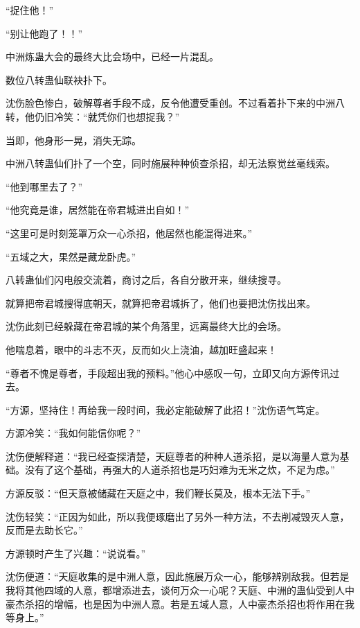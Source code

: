 
\begin{this_body}

“捉住他！”

“别让他跑了！！”

中洲炼蛊大会的最终大比会场中，已经一片混乱。

数位八转蛊仙联袂扑下。

沈伤脸色惨白，破解尊者手段不成，反令他遭受重创。不过看着扑下来的中洲八转，他仍旧冷笑：“就凭你们也想捉我？”

当即，他身形一晃，消失无踪。

中洲八转蛊仙们扑了一个空，同时施展种种侦查杀招，却无法察觉丝毫线索。

“他到哪里去了？”

“他究竟是谁，居然能在帝君城进出自如！”

“这里可是时刻笼罩万众一心杀招，他居然也能混得进来。”

“五域之大，果然是藏龙卧虎。”

八转蛊仙们闪电般交流着，商讨之后，各自分散开来，继续搜寻。

就算把帝君城搜得底朝天，就算把帝君城拆了，他们也要把沈伤找出来。

沈伤此刻已经躲藏在帝君城的某个角落里，远离最终大比的会场。

他喘息着，眼中的斗志不灭，反而如火上浇油，越加旺盛起来！

“尊者不愧是尊者，手段超出我的预料。”他心中感叹一句，立即又向方源传讯过去。

“方源，坚持住！再给我一段时间，我必定能破解了此招！”沈伤语气笃定。

方源冷笑：“我如何能信你呢？”

沈伤便解释道：“我已经查探清楚，天庭尊者的种种人道杀招，是以海量人意为基础。没有了这个基础，再强大的人道杀招也是巧妇难为无米之炊，不足为虑。”

方源反驳：“但天意被储藏在天庭之中，我们鞭长莫及，根本无法下手。”

沈伤轻笑：“正因为如此，所以我便琢磨出了另外一种方法，不去削减毁灭人意，反而是去助长它。”

方源顿时产生了兴趣：“说说看。”

沈伤便道：“天庭收集的是中洲人意，因此施展万众一心，能够辨别敌我。但若是我将其他四域的人意，都增添进去，谈何万众一心呢？天庭、中洲的蛊仙受到人中豪杰杀招的增幅，也是因为中洲人意。若是五域人意，人中豪杰杀招也将作用在我等身上。”


\end{this_body}
